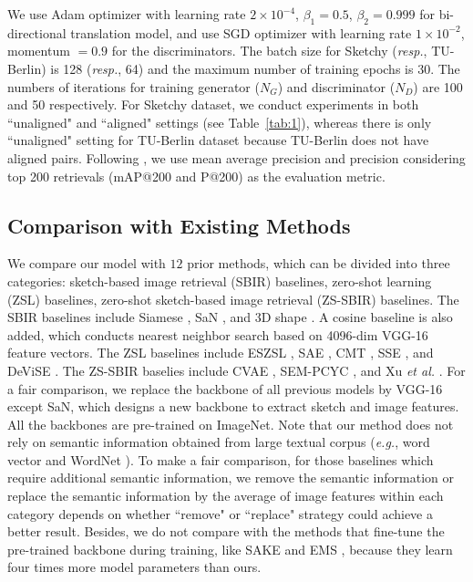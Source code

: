 \documentclass[10pt,twocolumn,letterpaper]{article}
\begin{document}
We use Adam \cite{kingma2014adam} optimizer with learning rate $2 \times 10^{-4}$, $\beta_1 = 0.5$, $\beta_2 = 0.999$ for bi-directional translation model, and use SGD optimizer with learning rate $1 \times 10^{-2}$, momentum $=0.9$ for the discriminators. The batch size for Sketchy (\emph{resp.}, TU-Berlin) is 128 (\emph{resp.}, 64) and the maximum number of training epochs is 30. The numbers of iterations for training generator ($N_{G}$) and discriminator ($N_{D}$) are 100 and 50 respectively. For Sketchy dataset, we conduct experiments in both ``unaligned" and ``aligned" settings (see Table~\ref{tab:1}), whereas there is only ``unaligned" setting for TU-Berlin dataset because TU-Berlin does not have aligned pairs. Following \cite{yelamarthi2018zero}, we use mean average precision and precision considering top 200 retrievals (mAP@200 and P@200) as the evaluation metric.

\subsection{Comparison with Existing Methods}
We compare our model with $12$ prior methods, which can be divided into three categories: sketch-based image retrieval (SBIR) baselines, zero-shot learning (ZSL) baselines, zero-shot sketch-based image retrieval (ZS-SBIR) baselines. 
The SBIR baselines include Siamese \cite{yelamarthi2018zero}, SaN \cite{yu2017sketch}, and 3D shape \cite{wang2015sketch}. A cosine baseline is also added, which conducts nearest neighbor search based on 4096-dim VGG-16 \cite{simonyan2014very} feature vectors.
The ZSL baselines include ESZSL \cite{romera2015embarrassingly}, SAE \cite{kodirov2017semantic}, CMT \cite{socher2013zero}, SSE \cite{zhang2015bit}, and DeViSE \cite{frome2013devise}.
The ZS-SBIR baselies include CVAE \cite{yelamarthi2018zero}, SEM-PCYC \cite{dutta2019semantically}, and Xu \textit{et al.} \cite{xu2019semantic}.
For a fair comparison, we replace the backbone of all previous models by VGG-16 except SaN, which designs a new backbone to extract sketch and image features. 
All the backbones are pre-trained on ImageNet. 
Note that our method does not rely on semantic information obtained from large textual corpus (\emph{e.g.}, word vector \cite{mikolov2013distributed} and WordNet \cite{miller1998wordnet}). To make a fair comparison, for those baselines which require additional semantic information, we remove the semantic information \cite{dutta2019semantically} or replace the semantic information by the average of image features within each category \cite{wang2015sketch, romera2015embarrassingly, kodirov2017semantic, socher2013zero, zhang2015bit, frome2013devise, xu2019semantic} \protect\footnotemark[1] depends on whether ``remove" or ``replace" strategy could achieve a better result. 
Besides, we do not compare with the methods that fine-tune the pre-trained backbone during training, like SAKE \cite{liu2019semantic} and EMS \cite{lu2018learning}, because they learn four times more model parameters than ours.
\end{document}
